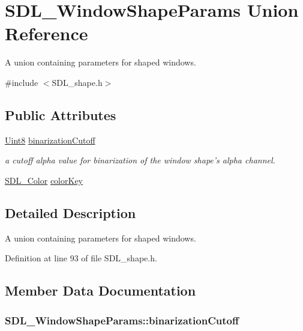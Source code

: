 \hypertarget{union_s_d_l___window_shape_params}{\section{S\-D\-L\-\_\-\-Window\-Shape\-Params Union Reference}
\label{union_s_d_l___window_shape_params}
}


A union containing parameters for shaped windows.  




{\ttfamily \#include $<$S\-D\-L\-\_\-shape.\-h$>$}

\subsection*{Public Attributes}
\begin{DoxyCompactItemize}
\item 
\hyperlink{_s_d_l__stdinc_8h_a2944638813a090aa23e62f4da842c3e2}{Uint8} \hyperlink{union_s_d_l___window_shape_params_a534c40b09588a8075c0a70227753dc56}{binarization\-Cutoff}
\begin{DoxyCompactList}\small\item\em a cutoff alpha value for binarization of the window shape's alpha channel. \end{DoxyCompactList}\item 
\hyperlink{struct_s_d_l___color}{S\-D\-L\-\_\-\-Color} \hyperlink{union_s_d_l___window_shape_params_a8bf3e442a51a1bbf452cfec7c1ed5318}{color\-Key}
\end{DoxyCompactItemize}


\subsection{Detailed Description}
A union containing parameters for shaped windows. 

Definition at line 93 of file S\-D\-L\-\_\-shape.\-h.



\subsection{Member Data Documentation}
\hypertarget{union_s_d_l___window_shape_params_a534c40b09588a8075c0a70227753dc56}{
\subsubsection[{binarization\-Cutoff}]{ S\-D\-L\-\_\-\-Window\-Shape\-Params\-::binarization\-Cutoff}}\label{union_s_d_l___window_shape_params_a534c40b09588a8075c0a70227753dc56}


